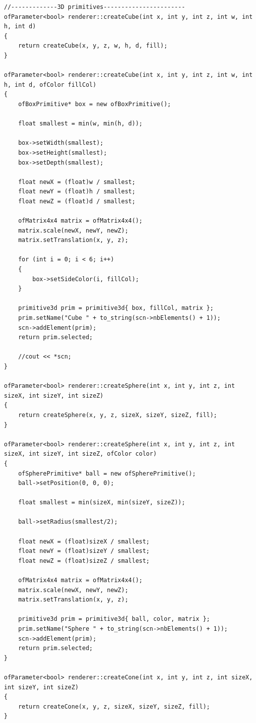 \begin{lstlisting}
//-------------3D primitives-----------------------
ofParameter<bool> renderer::createCube(int x, int y, int z, int w, int h, int d)
{
	return createCube(x, y, z, w, h, d, fill);
}

ofParameter<bool> renderer::createCube(int x, int y, int z, int w, int h, int d, ofColor fillCol)
{
	ofBoxPrimitive* box = new ofBoxPrimitive();
	
	float smallest = min(w, min(h, d));
	
	box->setWidth(smallest);
	box->setHeight(smallest);
	box->setDepth(smallest);
	
	float newX = (float)w / smallest;
	float newY = (float)h / smallest;
	float newZ = (float)d / smallest;
	
	ofMatrix4x4 matrix = ofMatrix4x4();
	matrix.scale(newX, newY, newZ);
	matrix.setTranslation(x, y, z);
	
	for (int i = 0; i < 6; i++)
	{
		box->setSideColor(i, fillCol);
	}
	
	primitive3d prim = primitive3d{ box, fillCol, matrix };
	prim.setName("Cube " + to_string(scn->nbElements() + 1));
	scn->addElement(prim);
	return prim.selected;
	
	//cout << *scn;
}

ofParameter<bool> renderer::createSphere(int x, int y, int z, int sizeX, int sizeY, int sizeZ)
{
	return createSphere(x, y, z, sizeX, sizeY, sizeZ, fill);
}

ofParameter<bool> renderer::createSphere(int x, int y, int z, int sizeX, int sizeY, int sizeZ, ofColor color)
{
	ofSpherePrimitive* ball = new ofSpherePrimitive();
	ball->setPosition(0, 0, 0);
	
	float smallest = min(sizeX, min(sizeY, sizeZ));
	
	ball->setRadius(smallest/2);
	
	float newX = (float)sizeX / smallest;
	float newY = (float)sizeY / smallest;
	float newZ = (float)sizeZ / smallest;
	
	ofMatrix4x4 matrix = ofMatrix4x4();
	matrix.scale(newX, newY, newZ);
	matrix.setTranslation(x, y, z);
	
	primitive3d prim = primitive3d{ ball, color, matrix };
	prim.setName("Sphere " + to_string(scn->nbElements() + 1));
	scn->addElement(prim);
	return prim.selected;
}

ofParameter<bool> renderer::createCone(int x, int y, int z, int sizeX, int sizeY, int sizeZ)
{
	return createCone(x, y, z, sizeX, sizeY, sizeZ, fill);
}


\end{lstlisting}

